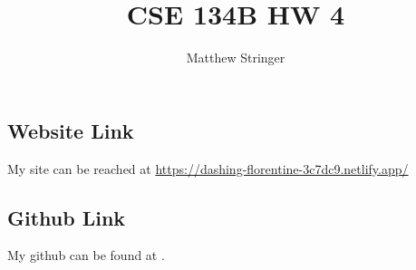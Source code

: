 \documentclass{article}
\title{CSE 134B HW 4}
\author{
  Matthew Stringer
}
\theoremstyle{definition}
\begin{document}
    \maketitle
    \subsection*{Website Link}
    My site can be reached at \url{https://dashing-florentine-3c7dc9.netlify.app/}
    \subsection*{Github Link}
    My github can be found at \url{}.
\end{document}
